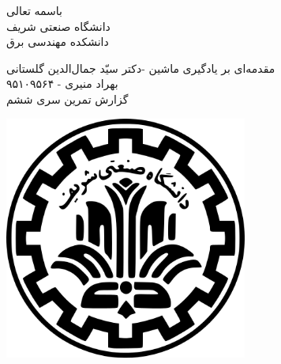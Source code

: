 \documentclass[a4paper]{article}
\begin{document}
\begin{minipage}{0.6\textwidth}

\begin{center}
	\begin{bf}
	باسمه تعالی\\
	\vspace{0.25cm}
	دانشگاه صنعتی شریف\\
	\vspace{0.25cm}
	دانشکده مهندسی برق\\
	\vspace{0.5cm}

\large
مقدمه‌ای بر یادگیری ماشین -دکتر سیّد جمال‌الدین گلستانی\\
\vspace{0.3cm}
\normalsize
بهراد منیری - ۹۵۱۰۹۵۶۴\\
\Large
\vspace{0.3cm}
گزارش  تمرین سری ششم\\
\vspace{0.4cm}

\end{bf}
\end{center}
\end{minipage} \hfill
\begin{minipage}{0.35\textwidth}

\begin{flushleft}
\includegraphics[width=0.6\textwidth]{Shariflogo.png}\\ \large
\end{flushleft}
\end{minipage}
\end{document}
